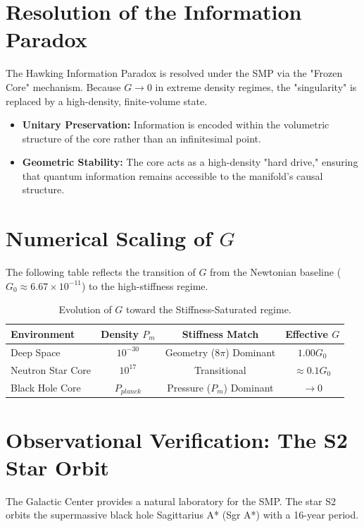\documentclass[11pt,letterpaper]{article}
\begin{document}
\section{Resolution of the Information Paradox}
The Hawking Information Paradox \cite{Hawking1976} is resolved under the SMP via the "Frozen Core" mechanism. Because $G \to 0$ in extreme density regimes, the "singularity" is replaced by a high-density, finite-volume state. 
\begin{itemize}
    \item \textbf{Unitary Preservation:} Information is encoded within the volumetric structure of the core rather than an infinitesimal point.
    \item \textbf{Geometric Stability:} The core acts as a high-density "hard drive," ensuring that quantum information remains accessible to the manifold's causal structure.
\end{itemize}

\section{Numerical Scaling of $G$}
The following table reflects the transition of $G$ from the Newtonian baseline ($G_0 \approx 6.67 \times 10^{-11}$) to the high-stiffness regime.

\begin{table}[h!]
\centering
\begin{tabular}{|l|c|c|c|}
\hline
\textbf{Environment} & \textbf{Density $P_m$} & \textbf{Stiffness Match} & \textbf{Effective $G$} \\ \hline
Deep Space & $10^{-30}$ & Geometry ($8\pi$) Dominant & $1.00 G_0$ \\ \hline
Neutron Star Core & $10^{17}$ & Transitional & $\approx 0.1 G_0$ \\ \hline
Black Hole Core & $P_{planck}$ & Pressure ($P_m$) Dominant & $\to 0$ \\ \hline
\end{tabular}
\caption{Evolution of $G$ toward the Stiffness-Saturated regime.}
\end{table}

\section{Observational Verification: The S2 Star Orbit}
The Galactic Center provides a natural laboratory for the SMP. The star S2 orbits the supermassive black hole Sagittarius A* (Sgr A*) with a 16-year period.
\end{document}
